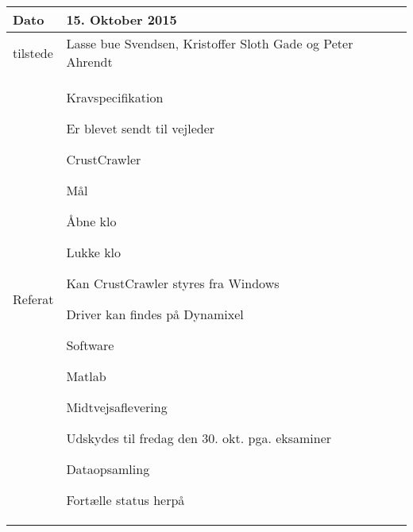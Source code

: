 \begin{center}
	\begin{tabular}{| l | p{10cm} |}
		\hline
		Dato		& 15. Oktober 2015\\ \hline
		tilstede 	& Lasse bue Svendsen, Kristoffer Sloth Gade og Peter Ahrendt\\ \hline
		Referat		& \vspace{-5mm}\begin{myEnumerate}
			\item Kravspecifikation
			\begin{myItemize}				
				\item Er blevet sendt til vejleder
			\end{myItemize}
			\item CrustCrawler
			\begin{myItemize}
				\item Mål
				\begin{myItemize}
					\item Åbne klo
					\item Lukke klo
				\end{myItemize}
				\item Kan CrustCrawler styres fra Windows
				\begin{myItemize}
					\item Driver kan findes på Dynamixel
					\begin{myItemize}
						\item Software
						\item Matlab
					\end{myItemize}
				\end{myItemize}
			\end{myItemize}
			\item Midtvejsaflevering
			\begin{myItemize}
				\item Udskydes til fredag den 30. okt. pga. eksaminer
			\end{myItemize}
			\item Dataopsamling
			\begin{myItemize}
				\item Fortælle status herpå
			\end{myItemize}
		\end{myEnumerate}\\ 	
		\hline
	\end{tabular}
\end{center}

